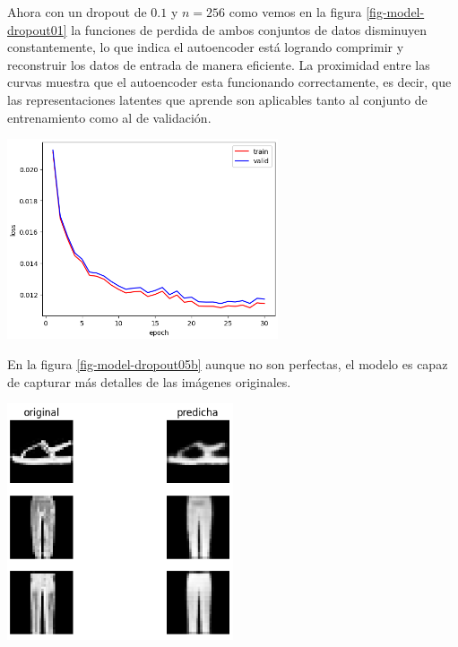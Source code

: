 \documentclass[aps,prl,reprint,groupedaddress]{revtex4-2}
\newenvironment{Figura}
  {\par\medskip\noindent\minipage{\linewidth}}
  {\endminipage\par\medskip}
\begin{document}
Ahora con un dropout de $0.1$ y $n=256$ como vemos en la figura 
\ref{fig-model-dropout01} la funciones de perdida de ambos conjuntos de datos 
disminuyen constantemente, lo que indica el autoencoder está logrando comprimir 
y reconstruir los datos de entrada de manera eficiente. La proximidad entre las 
curvas muestra que el autoencoder esta funcionando correctamente, es decir, 
que las representaciones latentes que aprende son aplicables tanto al conjunto 
de entrenamiento como al de validación.
\begin{Figura}
  \centering
  \includegraphics[width=0.60\textwidth]{figs1/modelo_n256_dropout01.png}
  \label{fig-model-dropout01-256}
\end{Figura}

En la figura \ref{fig-model-dropout05b} aunque no son perfectas, el modelo es 
capaz de capturar más detalles de las imágenes originales.
\begin{Figura}
  \centering
  \includegraphics[width=0.5\textwidth]{figs1/test_modelo_n256_dropout01.png}
  \label{fig-model-dropout01b-256}
\end{Figura}
\end{document}
